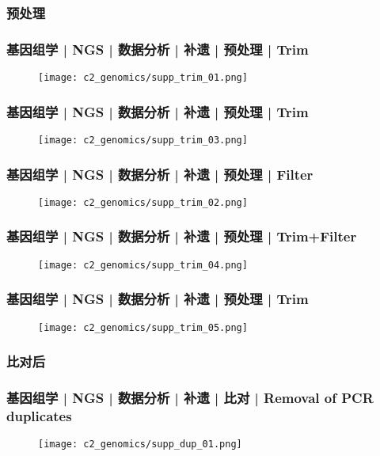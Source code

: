 \subsubsection{预处理}
\begin{frame}
  \frametitle{基因组学 | NGS | 数据分析 | 补遗 | 预处理 | Trim}
  \begin{figure}
    \centering
    \texttt{[image: c2\_genomics/supp\_trim\_01.png]}
  \end{figure}
\end{frame}

\begin{frame}
  \frametitle{基因组学 | NGS | 数据分析 | 补遗 | 预处理 | Trim}
  \begin{figure}
    \centering
    \texttt{[image: c2\_genomics/supp\_trim\_03.png]}
  \end{figure}
\end{frame}

\begin{frame}
  \frametitle{基因组学 | NGS | 数据分析 | 补遗 | 预处理 | Filter}
  \begin{figure}
    \centering
    \texttt{[image: c2\_genomics/supp\_trim\_02.png]}
  \end{figure}
\end{frame}

\begin{frame}
  \frametitle{基因组学 | NGS | 数据分析 | 补遗 | 预处理 | Trim+Filter}
  \begin{figure}
    \centering
    \texttt{[image: c2\_genomics/supp\_trim\_04.png]}
  \end{figure}
\end{frame}

\begin{frame}
  \frametitle{基因组学 | NGS | 数据分析 | 补遗 | 预处理 | Trim}
  \begin{figure}
    \centering
    \texttt{[image: c2\_genomics/supp\_trim\_05.png]}
  \end{figure}
\end{frame}

\subsubsection{比对后}
\begin{frame}
  \frametitle{基因组学 | NGS | 数据分析 | 补遗 | 比对 | Removal of PCR duplicates}
  \begin{figure}
    \centering
    \texttt{[image: c2\_genomics/supp\_dup\_01.png]}
  \end{figure}
\end{frame}

